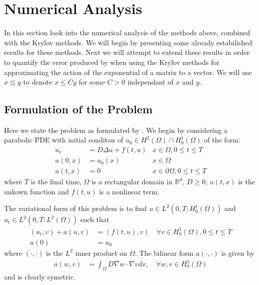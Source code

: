 \section{Numerical Analysis}

In this section look into the numerical analysis of the methods above, combined with the Krylov methods.
We will begin by presenting some already estabilished results for these methods.
Next we will attempt to extend these results in order to quantify the error produced by when using the Krylov methods for approximating the action of the exponential of a matrix to a vector.
We will use $x \lesssim y$ to denote $x \leq C y$ for some $C>0$ independant of $x$ and $y$.
\subsection{Formulation of the Problem}
Here we state the problem as formulated by \cite{Huang2022}.
We begin by considering a parabolic PDE with initial conditon of $u_0 \in H^2(\Omega) \cap H^1_0(\Omega)$ of the form:
\begin{align*}
    u_t &= D \Delta u + f(t,u) &x\in \Omega, 0 \leq t \leq T\\
    u(0,x) &= u_0(x) &x\in \Omega\\
    u(t,x) &= 0 &x\in \partial \Omega, 0 \leq t \leq T
\end{align*}
where $T$ is the final time, $\Omega$ is a rectangular domain in $\mathbb{R}^d$, $D\geq 0$, $u(t,x)$ is the unkown function and $f(t,u)$ is a nonlinear term.

The variational form of this problem is to find $u\in L^2(0,T;H^1_0(\Omega))$ and $u_t \in L^2(0,T: L^2(\Omega))$ such that
\begin{align*}
    (u_t, v) + a(u, v) &= (f(t,u),v) \quad \forall v \in H^1_0(\Omega), 0\leq t \leq T\\
    u(0) &= u_0
\end{align*}
where $(\cdot,\cdot)$ is the $L^2$ inner product on $\Omega$.
The bilinear form $a(\cdot,\cdot)$ is given by
\begin{align*}
    a(w,v) &= \int_{\Omega} D \nabla w \cdot \nabla v dx, \quad \forall w, v \in H^1_0(\Omega)
\end{align*}
and is clearly symetric.

